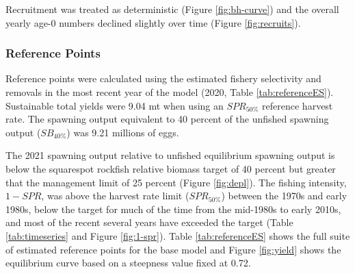 \documentclass[11pt,
  english,
  a4paper,
]{article}
\begin{document}
Recruitment was treated as deterministic (Figure \ref{fig:bh-curve}) and the overall yearly age-0 numbers declined slightly over time (Figure \ref{fig:recruits}).

\leavevmode\tagmcend\tagstructend\par


\hypertarget{reference-points}{%
\subsubsection{Reference Points}\label{reference-points}}

\leavevmode\tagmcend\tagstructend


Reference points were calculated using the estimated fishery selectivity and removals in the most recent year of the model (2020, Table \ref{tab:referenceES}). Sustainable total yields were 9.04 mt when using an {\(SPR_{50\%}\)\leavevmode\tagmcend\tagstructend} reference harvest rate. The spawning output equivalent to 40 percent of the unfished spawning output ({\(SB_{40\%}\)\leavevmode\tagmcend\tagstructend}) was 9.21 millions of eggs.

\leavevmode\tagmcend\tagstructend\par


The 2021 spawning output relative to unfished equilibrium spawning output is below the squarespot rockfish relative biomass target of 40 percent but greater that the management limit of 25 percent (Figure \ref{fig:depl}). The fishing intensity, {\(1-SPR\)\leavevmode\tagmcend\tagstructend}, was above the harvest rate limit ({\(SPR_{50\%}\)\leavevmode\tagmcend\tagstructend}) between the 1970s and early 1980s, below the target for much of the time from the mid-1980s to early 2010s, and most of the recent several years have exceeded the target (Table \ref{tab:timeseries} and Figure \ref{fig:1-spr}). Table \ref{tab:referenceES} shows the full suite of estimated reference points for the base model and Figure \ref{fig:yield} shows the equilibrium curve based on a steepness value fixed at 0.72.

\leavevmode\tagmcend\tagstructend\par
\end{document}
